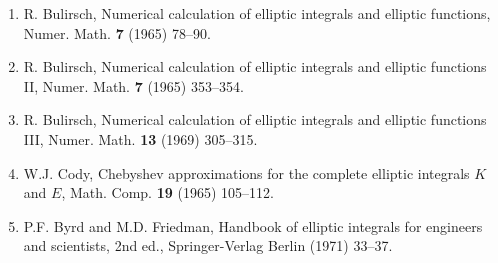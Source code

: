 \documentclass[]{article}
\begin{document}
\begin{enumerate}
\item R. Bulirsch, Numerical calculation of elliptic integrals and
elliptic functions, Numer. Math. {\bf 7} (1965) 78--90.
\item R. Bulirsch, Numerical calculation of elliptic integrals and
elliptic functions II, Numer. Math. {\bf 7} (1965) 353--354.
\item R. Bulirsch, Numerical calculation of elliptic integrals and
elliptic functions III, Numer. Math. {\bf 13} (1969) 305--315.
\item W.J. Cody, Chebyshev approximations for the complete elliptic
integrals $K$ and $E$, Math. Comp. {\bf 19} (1965) 105--112.
\item P.F. Byrd and M.D. Friedman, Handbook of elliptic integrals
for engineers and scientists, 2nd ed., Springer-Verlag Berlin (1971)
33--37.
\end{enumerate}
\end{document}
